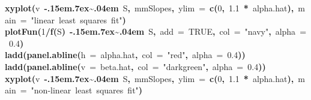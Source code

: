 \documentclass{article}
\makeatletter
\newcommand{\hlnumber}[1]{\textcolor[rgb]{0,0,0}{#1}}%
\newcommand{\hlfunctioncall}[1]{\textcolor[rgb]{0.501960784313725,0,0.329411764705882}{\textbf{#1}}}%
\newcommand{\hlstring}[1]{\textcolor[rgb]{0.6,0.6,1}{#1}}%
\newcommand{\hlkeyword}[1]{\textcolor[rgb]{0,0,0}{\textbf{#1}}}%
\newcommand{\hlargument}[1]{\textcolor[rgb]{0.690196078431373,0.250980392156863,0.0196078431372549}{#1}}%
\newcommand{\hlsymbol}[1]{\textcolor[rgb]{0,0,0}{#1}}%
\def\urltilda{\kern -.15em\lower .7ex\hbox{\~{}}\kern .04em}%
\newcommand{\hlstd}[1]{\textcolor[rgb]{0,0,0}{#1}}%
\newenvironment{kframe}{%
 \def\FrameCommand##1{\hskip\@totalleftmargin \hskip-\fboxsep
 \colorbox{shadecolor}{##1}\hskip-\fboxsep
     \hskip-\linewidth \hskip-\@totalleftmargin \hskip\columnwidth}%
 \MakeFramed {\advance\hsize-\width
   \@totalleftmargin\z@ \linewidth\hsize
   \@setminipage}}%
 {\par\unskip\endMakeFramed}
\newenvironment{knitrout}{}{} %
\makeatother
\begin{document}
\begin{knitrout}
\color{fgcolor}\begin{kframe}
\begin{flushleft}
\ttfamily\noindent
\hlfunctioncall{xyplot}\hlkeyword{(}\hlsymbol{v}{\ }\hlkeyword{\urltilda{}}{\ }\hlsymbol{S}\hlkeyword{,}{\ }\hlsymbol{mmSlopes}\hlkeyword{,}{\ }\hlargument{ylim}{\ }\hlargument{=}{\ }\hlfunctioncall{c}\hlkeyword{(}\hlnumber{0}\hlkeyword{,}{\ }\hlnumber{1.1}{\ }\hlkeyword{*}{\ }\hlsymbol{alpha.hat}\hlkeyword{)}\hlkeyword{,}{\ }\hlargument{main}{\ }\hlargument{=}{\ }\hlstring{"{}linear{\ }least{\ }squares{\ }fit"{}}\hlkeyword{)}\hspace*{\fill}\\
\hlstd{}\hlfunctioncall{plotFun}\hlkeyword{(}\hlnumber{1}\hlkeyword{/}\hlfunctioncall{f}\hlkeyword{(}\hlsymbol{S}\hlkeyword{)}{\ }\hlkeyword{\urltilda{}}{\ }\hlsymbol{S}\hlkeyword{,}{\ }\hlargument{add}{\ }\hlargument{=}{\ }\hlnumber{TRUE}\hlkeyword{,}{\ }\hlargument{col}{\ }\hlargument{=}{\ }\hlstring{"{}navy"{}}\hlkeyword{,}{\ }\hlargument{alpha}{\ }\hlargument{=}{\ }\hlnumber{0.4}\hlkeyword{)}\hspace*{\fill}\\
\hlstd{}\hlfunctioncall{ladd}\hlkeyword{(}\hlfunctioncall{panel.abline}\hlkeyword{(}\hlargument{h}{\ }\hlargument{=}{\ }\hlsymbol{alpha.hat}\hlkeyword{,}{\ }\hlargument{col}{\ }\hlargument{=}{\ }\hlstring{"{}red"{}}\hlkeyword{,}{\ }\hlargument{alpha}{\ }\hlargument{=}{\ }\hlnumber{0.4}\hlkeyword{)}\hlkeyword{)}\hspace*{\fill}\\
\hlstd{}\hlfunctioncall{ladd}\hlkeyword{(}\hlfunctioncall{panel.abline}\hlkeyword{(}\hlargument{v}{\ }\hlargument{=}{\ }\hlsymbol{beta.hat}\hlkeyword{,}{\ }\hlargument{col}{\ }\hlargument{=}{\ }\hlstring{"{}darkgreen"{}}\hlkeyword{,}{\ }\hlargument{alpha}{\ }\hlargument{=}{\ }\hlnumber{0.4}\hlkeyword{)}\hlkeyword{)}\hspace*{\fill}\\
\hlstd{}\hlfunctioncall{xyplot}\hlkeyword{(}\hlsymbol{v}{\ }\hlkeyword{\urltilda{}}{\ }\hlsymbol{S}\hlkeyword{,}{\ }\hlsymbol{mmSlopes}\hlkeyword{,}{\ }\hlargument{ylim}{\ }\hlargument{=}{\ }\hlfunctioncall{c}\hlkeyword{(}\hlnumber{0}\hlkeyword{,}{\ }\hlnumber{1.1}{\ }\hlkeyword{*}{\ }\hlsymbol{alpha.hat}\hlkeyword{)}\hlkeyword{,}{\ }\hlargument{main}{\ }\hlargument{=}{\ }\hlstring{"{}non-linear{\ }least{\ }squares{\ }fit"{}}\hlkeyword{)}\hspace*{\fill}\\

\end{flushleft}
\end{kframe}
\end{knitrout}
\end{document}
